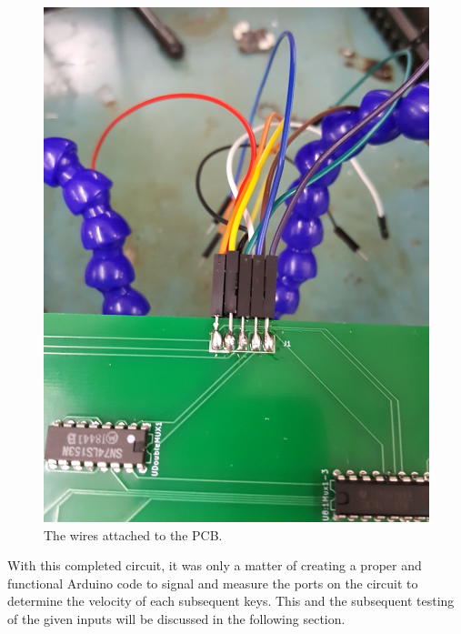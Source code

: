 \begin{figure}[h!]
  \centering
  \includegraphics[width=\linewidth]{image/pcbwires.jpg}
  \caption{The wires attached to the PCB.}
\end{figure}

With this completed circuit, it was only a matter of creating a proper and functional
Arduino code to signal and measure the ports on the circuit to determine the velocity of
each subsequent keys. This and the subsequent testing of the given inputs will be
discussed in the following section.